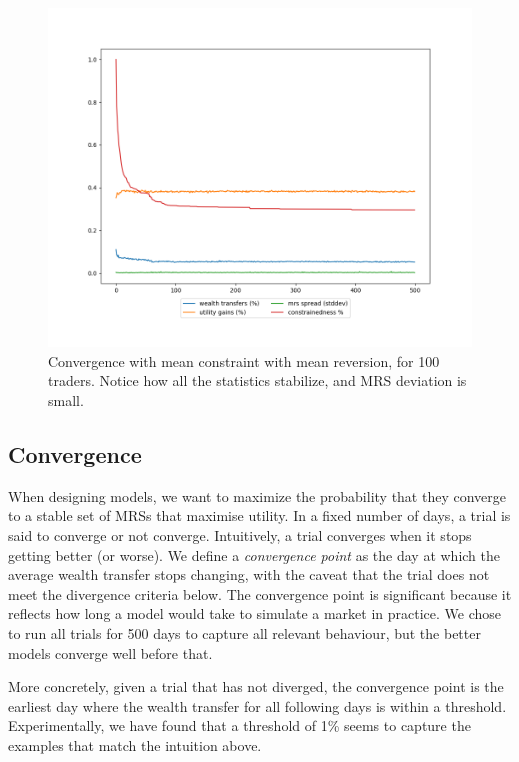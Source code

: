 \documentclass[12pt,a4paper,titlepage]{article}
\begin{document}
\begin{figure}[H]
    \centering
    \includegraphics[width=\textwidth]{seed_5.png}
    \caption{
      Convergence with mean constraint with mean reversion, for 100 traders.
      Notice how all the statistics stabilize, and MRS deviation is small.
    }
    \label{fig:conv}
\end{figure}

\subsection{Convergence}
When designing models, we want to maximize the probability that they converge to a stable set of MRSs that maximise utility.
In a fixed number of days, a trial is said to converge or not converge.
Intuitively, a trial converges when it stops getting better (or worse).
We define a \textit{convergence point} as the day at which the average wealth transfer stops changing, with the caveat that the trial does not meet the divergence criteria below.
The convergence point is significant because it reflects how long a model would take to simulate a market in practice.
We chose to run all trials for 500 days to capture all relevant behaviour, but the better models converge well before that.

More concretely, given a trial that has not diverged, the convergence point is the earliest day where the wealth transfer for all following days is within a threshold.
Experimentally, we have found that a threshold of 1\% seems to capture the examples that match the intuition above.
\end{document}
